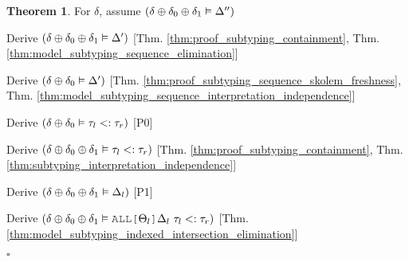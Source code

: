 \documentclass[acmsmall]{acmart}
\theoremstyle{definition}
\newtheorem{theorem}{Theorem}[section]
\begin{document}
\begin{theorem}
  \item \I \N For $\delta$, assume $(
    \delta \oplus \delta_0 \oplus \delta_1 \vDash \Delta''
  )$


  \item \I\I \N Derive $(
    \delta \oplus \delta_0 \oplus \delta_1 \vDash \Delta'
  )$ [Thm. \ref{thm:proof_subtyping_containment}, Thm. \ref{thm:model_subtyping_sequence_elimination}]
  \item \I\I \N Derive $(
    \delta \oplus \delta_0 \vDash \Delta'
  )$ [Thm. \ref{thm:proof_subtyping_sequence_skolem_freshness}, Thm. \ref{thm:model_subtyping_sequence_interpretation_independence}]
  \item \I\I \N Derive $(
    \delta \oplus \delta_0 \vDash \tau_l <: \tau_r
  )$ [P0]


  \item \I\I \N Derive $(
    \delta \oplus \delta_0 \oplus \delta_1 \vDash \tau_l <: \tau_r
  )$ [Thm. \ref{thm:proof_subtyping_containment}, Thm. \ref{thm:subtyping_interpretation_independence}]


  \item \I\I \N Derive $(
    \delta \oplus \delta_0 \oplus \delta_1 \vDash \Delta_l
  )$ [P1]

  \item \I\I \N Derive $(
    \delta \oplus \delta_0 \oplus \delta_1 \satisfies \J{ALL[}\Theta_l\J{]}\Delta_l\ \tau_l \subtypes \tau_r
  )$ [Thm. \ref{thm:model_subtyping_indexed_intersection_elimination}]


  \noindent
  $\square$
\end{theorem}
\hfill
\end{document}
